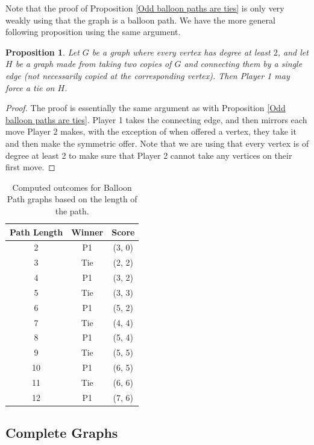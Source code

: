 \documentclass{article}
\newtheorem{proposition}[theorem]{Proposition}
\begin{document}
Note that the proof of Proposition \ref{Odd balloon paths are ties} is only very weakly using that the graph is a balloon path. We have the more general following proposition using the same argument. 

\begin{proposition} Let $G$ be a graph where every vertex has degree at least $2$, and let $H$ be a graph made from taking two copies of $G$ and connecting them by a single edge (not necessarily copied at the corresponding vertex). Then Player 1 may force a tie on $H$.
\end{proposition} 
\begin{proof} The proof is essentially the same argument as with Proposition \ref{Odd balloon paths are ties}. Player 1 takes the connecting edge, and then mirrors each move Player 2 makes, with the exception of when offered a vertex, they take it and then make the symmetric offer. Note that we are using that every vertex is of degree at least 2 to make sure that Player 2 cannot take any vertices on their first move.
\end{proof}



\begin{table}[hbt!]
\centering
\begin{tabular}{|c|c|c|}
\hline
\textbf{Path Length} & \textbf{Winner} & \textbf{Score} \\
\hline
2 & P1 & (3, 0) \\
3 & Tie & (2, 2) \\
4 & P1 & (3, 2) \\
5 & Tie & (3, 3) \\
6 & P1 & (5, 2) \\
7 & Tie & (4, 4) \\
8 & P1 & (5, 4) \\
9 & Tie & (5, 5) \\
10 & P1 & (6, 5) \\
11 & Tie & (6, 6) \\
12 & P1 & (7, 6) \\
\hline
\end{tabular}
\caption{Computed outcomes for Balloon Path graphs based on the length of the path.}
\label{table:balloon-path-outcomes}
\end{table}

\FloatBarrier 

\subsection{Complete Graphs}
\end{document}
